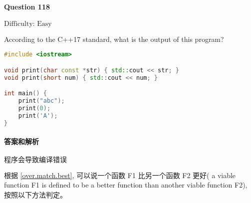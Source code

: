\documentclass{article}
\begin{document}
	\paragraph*{Question 118} $\boxed{\text{Difficulty: Easy}} $	
	
According to the C++17 standard, what is the output of this program?	

	\begin{lstlisting}[language=C++]
#include <iostream>

void print(char const *str) { std::cout << str; }
void print(short num) { std::cout << num; }

int main() {
	print("abc");
	print(0);
	print('A');
}
	\end{lstlisting}
	\paragraph*{答案和解析} $\boxed{\text{程序会导致编译错误}} $
	
	根据 \href{https://timsong-cpp.github.io/cppwp/n4659/over.match.best}{[over.match.best]}, 可以说一个函数 F1 比另一个函数 F2 更好( a viable function F1 is defined to be a better function than another viable function F2), 按照以下方法判定。
	
\end{document}
